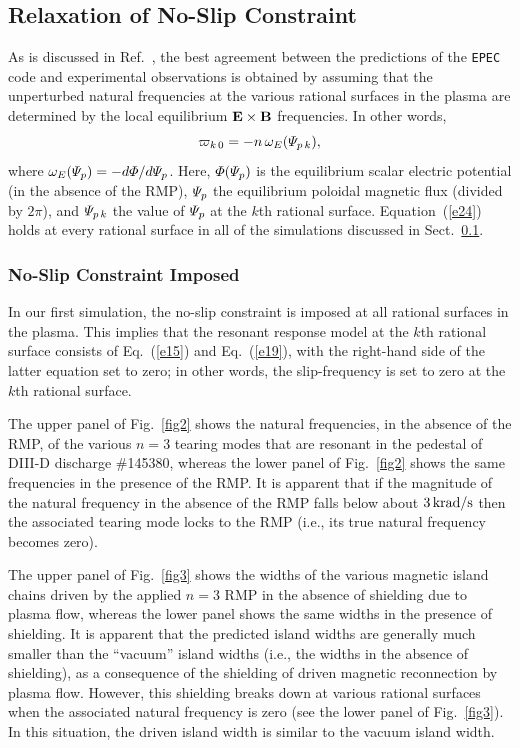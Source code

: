 \documentclass[12pt,prb,aps]{revtex4-1}
\begin{document}
\subsection{Relaxation of No-Slip Constraint}\label{s4a}
As is discussed in Ref.~, the best agreement between the predictions of the {\tt EPEC} code and experimental observations is
obtained by assuming that the unperturbed natural frequencies at the various rational surfaces in the plasma are determined by the
local equilibrium ${\bf E}\times {\bf B}$ frequencies. In other words, 
\begin{equation}\label{e24}
\varpi_{k\,0} =-n\,\omega_E({\mit\Psi}_{p\,k}),
\end{equation}
where 
$\omega_E({\mit\Psi}_p) = -d{\mit\Phi}/d{\mit\Psi}_p$.
Here, ${\mit\Phi}({\mit\Psi}_p)$ is the equilibrium scalar electric potential (in the absence of the RMP), ${\mit\Psi}_p$ the equilibrium poloidal magnetic flux (divided by $2\pi$), 
and ${\mit\Psi}_{p\,k}$  the value of ${\mit\Psi}_p$ at the $k$th rational surface.  Equation~(\ref{e24}) holds at
every rational surface in all of the simulations discussed in Sect.~\ref{s4a}. 

\subsubsection{No-Slip Constraint Imposed}
In our first simulation, the no-slip constraint is imposed at all rational surfaces in the plasma. This implies that the resonant response
model at the $k$th rational surface consists of Eq.~(\ref{e15}) and Eq.~(\ref{e19}), with the right-hand side of the latter equation
set to zero; in other words,  the slip-frequency is set to zero at the $k$th rational surface.

The upper panel of Fig.~\ref{fig2} shows the natural frequencies, in the absence of the RMP, of the various  $n=3$ tearing modes 
 that are resonant in the pedestal of DIII-D discharge \#145380, whereas  
  the lower panel of Fig.~\ref{fig2} shows the same frequencies  in the presence of the RMP.
   It is apparent that if the magnitude of the natural frequency in the absence of the RMP falls below about
$3\,{\rm krad/s}$ then the associated tearing mode locks to the RMP (i.e., its true natural frequency becomes zero). 

The upper panel of Fig.~\ref{fig3} shows the widths of the various  magnetic island chains driven by the applied $n=3$ RMP in the
absence of shielding due to plasma flow, whereas the lower panel
shows the same widths in the presence of shielding. It is apparent 
that the predicted island widths are generally much smaller than the ``vacuum'' island widths (i.e., the widths in the absence of shielding), as a consequence of the shielding of driven magnetic
reconnection by plasma flow. However, this shielding breaks down at various rational surfaces when the associated natural frequency is zero (see the lower panel of
Fig.~\ref{fig3}). In this situation, the driven island width is similar to the vacuum island width.
\end{document}
